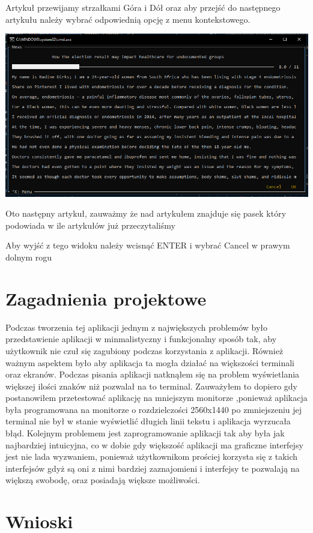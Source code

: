 \documentclass{article}
\begin{document}
Artykuł przewijamy strzałkami Góra i Dół oraz aby przejść do następnego artykułu należy wybrać odpowiednią opcję z menu kontekstowego.

\includegraphics[width=\textwidth]{images/next_article.png}

Oto następny artykuł, zauważmy że nad artykułem znajduje się pasek który podowiada w ile artykułów już przeczytaliśmy

Aby wyjść z tego widoku należy wcisnąć ENTER i wybrać Cancel w prawym dolnym rogu


\section{Zagadnienia projektowe}

Podczas tworzenia tej aplikacji jednym z największych problemów było przedstawienie aplikacji w minmalistyczny i funkcjonalny sposób tak,
aby użytkownik nie czuł się zagubiony podczas korzystania z aplikacji. Również ważnym aspektem było aby aplikacja ta mogła działać na większości terminali oraz
ekranów. Podczas pisania aplikacji natknąłem się na problem wyświetlania większej ilości znaków  niż pozwalał na to terminal. Zauważyłem to dopiero gdy postanowiłem przetestować aplikację na mniejszym monitorze
,ponieważ aplikacja była programowana na monitorze o rozdzielczości 2560x1440 po zmniejszeniu jej terminal nie był w stanie wyświetlić długich linii tekstu i aplikacja wyrzucała błąd.
Kolejnym problemem jest zaprogramowanie aplikacji tak aby była jak najbardziej intuicyjna, co w dobie gdy większość aplikacji ma graficzne interfejsy
jest nie lada wyzwaniem, ponieważ użytkownikom prościej korzysta się z takich interfejsów gdyż są oni z nimi bardziej zaznajomieni i interfejsy te pozwalają na większą swobodę, oraz posiadają większe możliwości.


\section{Wnioski}
\end{document}
